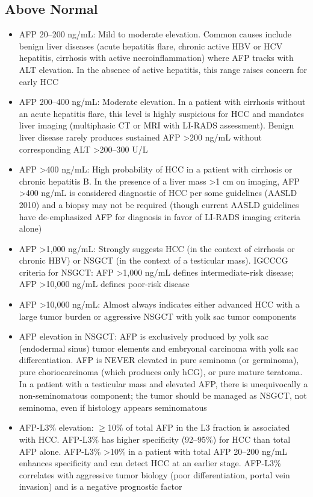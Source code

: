 \subsection*{Above Normal}
\begin{itemize}
  \item AFP 20--200 ng/mL: Mild to moderate elevation. Common causes include benign liver diseases (acute hepatitis flare, chronic active HBV or HCV hepatitis, cirrhosis with active necroinflammation) where AFP tracks with ALT elevation. In the absence of active hepatitis, this range raises concern for early HCC
  \item AFP 200--400 ng/mL: Moderate elevation. In a patient with cirrhosis without an acute hepatitis flare, this level is highly suspicious for HCC and mandates liver imaging (multiphasic CT or MRI with LI-RADS assessment). Benign liver disease rarely produces sustained AFP >200 ng/mL without corresponding ALT >200--300 U/L
  \item AFP >400 ng/mL: High probability of HCC in a patient with cirrhosis or chronic hepatitis B. In the presence of a liver mass >1 cm on imaging, AFP >400 ng/mL is considered diagnostic of HCC per some guidelines (AASLD 2010) and a biopsy may not be required (though current AASLD guidelines have de-emphasized AFP for diagnosis in favor of LI-RADS imaging criteria alone)
  \item AFP >1,000 ng/mL: Strongly suggests HCC (in the context of cirrhosis or chronic HBV) or NSGCT (in the context of a testicular mass). IGCCCG criteria for NSGCT: AFP >1,000 ng/mL defines intermediate-risk disease; AFP >10,000 ng/mL defines poor-risk disease
  \item AFP >10,000 ng/mL: Almost always indicates either advanced HCC with a large tumor burden or aggressive NSGCT with yolk sac tumor components
  \item AFP elevation in NSGCT: AFP is exclusively produced by yolk sac (endodermal sinus) tumor elements and embryonal carcinoma with yolk sac differentiation. AFP is NEVER elevated in pure seminoma (or germinoma), pure choriocarcinoma (which produces only hCG), or pure mature teratoma. In a patient with a testicular mass and elevated AFP, there is unequivocally a non-seminomatous component; the tumor should be managed as NSGCT, not seminoma, even if histology appears seminomatous
  \item AFP-L3\% elevation: $\geq$10\% of total AFP in the L3 fraction is associated with HCC. AFP-L3\% has higher specificity (92--95\%) for HCC than total AFP alone. AFP-L3\% >10\% in a patient with total AFP 20--200 ng/mL enhances specificity and can detect HCC at an earlier stage. AFP-L3\% correlates with aggressive tumor biology (poor differentiation, portal vein invasion) and is a negative prognostic factor

\end{itemize}
